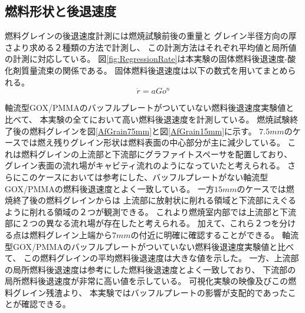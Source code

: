 \subsection{燃料形状と後退速度}
燃料グレインの後退速度計測には燃焼試験前後の重量と
グレイン半径方向の厚さより求める２種類の方法で計測し、
この計測方法はそれぞれ平均値と局所値の計測に対応している。
図\ref{fig:RegressionRate}は本実験の固体燃料後退速度-酸化剤質量流束の関係である。
固体燃料後退速度は以下の数式を用いてまとめられる。
\begin{equation}
\dot{r} = aGo^n
\end{equation}

軸流型GOX/PMMAのバッフルプレートがついていない燃料後退速度実験値と比べて、
本実験の全てにおいて高い燃料後退速度を計測している。
燃焼試験終了後の燃料グレインを図\ref{AfGrain75mm}と図\ref{AfGrain15mm}に示す。
$7.5mm$のケースでは燃え残りグレイン形状は燃料表面の中心部分が主に減少している。
これは燃料グレインの上流部と下流部にグラファイトスペーサを配置しており、
グレイン表面の流れ場がキャビティ流れのようになっていたと考えられる。
さらにこのケースにおいては参考にした、バッフルプレートがない軸流型GOX/PMMAの燃料後退速度とよく一致している。
一方$15mm$のケースでは燃焼終了後の燃料グレインからは
上流部に放射状に削れる領域と下流部にえぐるように削れる領域の２つが観測できる。
これより燃焼室内部では上流部と下流部に２つの異なる流れ場が存在したと考えられる。
加えて、これら２つを分ける点は燃料グレイン上端から$7mm$の付近に明確に確認することができる。
軸流型GOX/PMMAのバッフルプレートがついていない燃料後退速度実験値と比べて、
この燃料グレインの平均燃料後退速度は大きな値を示した。
一方、上流部の局所燃料後退速度は参考にした燃料後退速度とよく一致しており、
下流部の局所燃料後退速度が非常に高い値を示している。
可視化実験の映像及びこの燃料グレイン残渣より、
本実験ではバッフルプレートの影響が支配的であったことが確認できる。
\\
\ 

